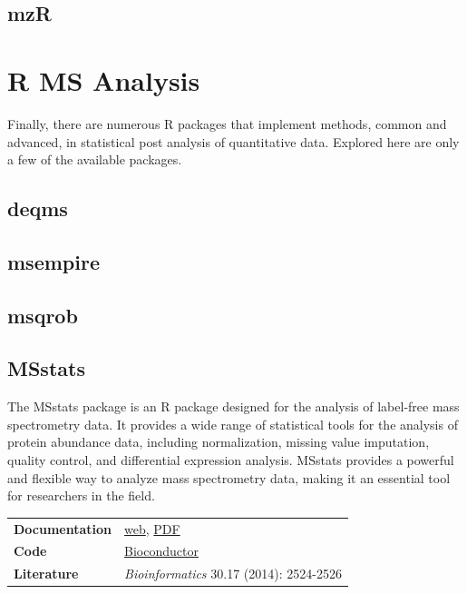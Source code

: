 \documentclass[
]{book}
\begin{document}
\hypertarget{mzr}{%
\subsection*{mzR}\label{mzr}}

\hypertarget{r-ms-analysis}{%
\section{R MS Analysis}\label{r-ms-analysis}}

Finally, there are numerous R packages that implement methods, common and advanced, in statistical post analysis of quantitative data. Explored here are only a few of the available packages.

\hypertarget{deqms}{%
\subsection*{deqms}\label{deqms}}

\hypertarget{msempire}{%
\subsection*{msempire}\label{msempire}}

\hypertarget{msqrob}{%
\subsection*{msqrob}\label{msqrob}}

\hypertarget{msstats}{%
\subsection*{MSstats}\label{msstats}}

The MSstats package is an R package designed for the analysis of label-free mass spectrometry data. It provides a wide range of statistical tools for the analysis of protein abundance data, including normalization, missing value imputation, quality control, and differential expression analysis. MSstats provides a powerful and flexible way to analyze mass spectrometry data, making it an essential tool for researchers in the field.

\begin{longtable}[]{@{}
  >{\raggedright\arraybackslash}p{}
  >{\raggedright\arraybackslash}p{}@{}}
\toprule\noalign{}
\endhead
\bottomrule\noalign{}
\endlastfoot
\textbf{Documentation} & \href{https://msstats.org}{web}, \href{https://bioconductor.org/packages/release/bioc/manuals/MSstats/man/MSstats.pdf}{PDF} \\
\textbf{Code} & \href{https://www.bioconductor.org/packages/release/bioc/html/MSstats.html}{Bioconductor} \\
\textbf{Literature} & \emph{Bioinformatics} 30.17 (2014): 2524-2526 \\
\end{longtable}
\end{document}
